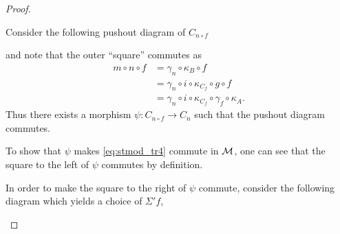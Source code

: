 \begin{proof}
\begin{enumerate}[label={(\bfseries TR\arabic*)}]
{            Consider the following pushout diagram of \( C_{n \circ f} \)
            \begin{center}
            \end{center}
            and note that the outer ``square'' commutes as
            \begin{equation}
                \label{eq:stmod_tr4_m_n_f_equal_something_else}
                \begin{aligned}
                    m \circ n \circ f &= \gamma_n \circ \kappa_B \circ f \\
                    &= \gamma_n \circ i \circ \kappa_{C_f} \circ g \circ f \\
                    &= \gamma_n \circ i \circ \kappa_{C_f} \circ \gamma_f \circ \kappa_A.
                \end{aligned}
            \end{equation}
            Thus there exists a morphism \( \psi: C_{n \circ f} \to C_n \) such that the pushout diagram commutes.

            To show that \( \psi \) makes \autoref{eq:stmod_tr4} commute in \( {\mathcal{M}} \), one can see that the square to the left of \( \psi \) commutes by definition.

            In order to make the square to the right of \( \psi \) commute, consider the following diagram which yields a choice of \( \Sigma' f \),
            \begin{center}
\end{center}}
\end{enumerate}
\end{proof}
